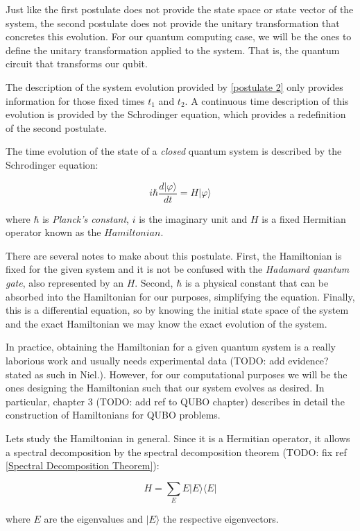 Just like the first postulate does not provide the state space or state vector of the system, the second postulate does not provide the unitary transformation that concretes this evolution. For our quantum computing case, we will be the ones to define the unitary transformation applied to the system. That is, the quantum circuit that transforms our qubit.

The description of the system evolution provided by \ref{postulate 2} only provides information for those fixed times $t_1$ and $t_2$. A continuous time description of this evolution is provided by the Schrodinger equation, which provides a redefinition of the second postulate.

\begin{postulate}
	The time evolution of the state of a \emph{closed} quantum system is described by the Schrodinger equation:
	
	$$ i \hbar \frac{d|\varphi\rangle}{dt} = H|\varphi\rangle $$
	
	where $\hbar$ is \emph{Planck’s constant}, $i$ is the imaginary unit and $H$ is a fixed Hermitian operator known as the $Hamiltonian$.
\end{postulate}

There are several notes to make about this postulate. First, the Hamiltonian is fixed for the given system and it is not be confused with the \emph{Hadamard quantum gate}, also represented by an $H$. Second, $\hbar$ is a physical constant that can be absorbed into the Hamiltonian for our purposes, simplifying the equation. Finally, this is a differential equation, so by knowing the initial state space of the system and the exact Hamiltonian we may know the exact evolution of the system.

In practice, obtaining the Hamiltonian for a given quantum system is a really laborious work and usually needs experimental data (TODO: add evidence? stated as such in Niel.). However, for our computational purposes we will be the ones designing the Hamiltonian such that our system evolves as desired. In particular, chapter 3 (TODO: add ref to QUBO chapter) describes in detail the construction of Hamiltonians for QUBO problems.

Lets study the Hamiltonian in general. Since it is a Hermitian operator, it allows a spectral decomposition by the spectral decomposition theorem (TODO: fix ref \ref{Spectral Decomposition Theorem}):

$$ H = \sum_E E |E\rangle\langle E| $$

where $E$ are the eigenvalues and $|E\rangle$ the respective eigenvectors. 



